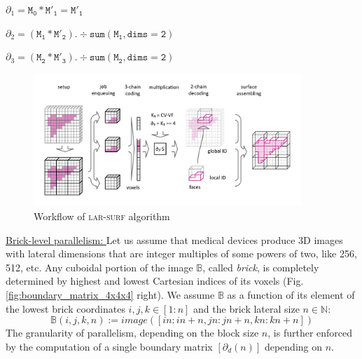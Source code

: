 \documentclass{article}
\newcommand{\B}{\mathbb{B}}
\newcommand{\N}{\mathbb{N}}
\begin{document}
$\partial_1 =  \mathtt{M_0} * \mathtt{M'_1} = \mathtt{M'_1}$

$\partial_2 =  \left(\mathtt{M_1} * \mathtt{M'_2}\right) .\div \mathtt{sum(M_1, dims=2)}$

$\partial_3 =  \left(\mathtt{M_2} * \mathtt{M'_3}\right) .\div \mathtt{sum(M_2, dims=2)}$
\begin{figure}[tbp]
\centering
\includegraphics[width=0.9\textwidth]{figs/schema_horizontal.pdf} 
\caption{Workflow of \textsc{lar-surf} algorithm}
\label{fig:schema}
\end{figure}



\vspace{10pt}
\noindent\underline{
Brick-level parallelism:
}\vspace{0.2em}\newline 
Let us assume that medical devices produce 3D images with lateral dimensions that are integer multiples of some powers of two, like 256, 512, etc.
Any cuboidal portion of the image 
$\B$, called \emph{brick},
is completely determined by highest and lowest Cartesian indices of its voxels (Fig. \ref{fig:boundary_matrix_4x4x4} right).
We assume 
$\B$ as a function of its element of the  lowest  brick coordinates $i,j,k\in \left[1:n\right]$ and 
the brick lateral size $n\in\N$:
\[
\B(i,j,k,n) := image([in:in+n, jn:jn+n, kn:kn+n]) 
\]
The granularity of parallelism, depending on the block size $n$, is further enforced by the computation of a single boundary matrix $[\partial_d(n)]$ depending on $n$.
\end{document}

